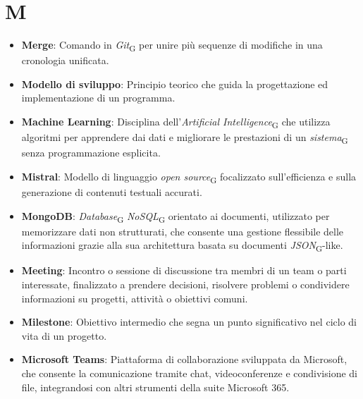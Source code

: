 \section{M}
\begin{itemize}
    \item \textbf{Merge}: Comando in \textit{Git}\textsubscript{G} per unire più sequenze di modifiche in una cronologia unificata.
    \item \textbf{Modello di sviluppo}: Principio teorico che guida la progettazione ed implementazione di un programma.
    \item \textbf{Machine Learning}: Disciplina dell'\textit{Artificial Intelligence}\textsubscript{G} che utilizza algoritmi per apprendere dai dati e migliorare le prestazioni di un \textit{sistema}\textsubscript{G} senza programmazione esplicita.
    \item \textbf{Mistral}: Modello di linguaggio \textit{open source}\textsubscript{G} focalizzato sull'efficienza e sulla generazione di contenuti testuali accurati.
    \item \textbf{MongoDB}: \textit{Database}\textsubscript{G} \textit{NoSQL}\textsubscript{G} orientato ai documenti, utilizzato per memorizzare dati non strutturati, che consente una gestione flessibile delle informazioni grazie alla sua architettura basata su documenti \textit{JSON}\textsubscript{G}-like.
    \item \textbf{Meeting}: Incontro o sessione di discussione tra membri di un team o parti interessate, finalizzato a prendere decisioni, risolvere problemi o condividere informazioni su progetti, attività o obiettivi comuni.
    \item \textbf{Milestone}: Obiettivo intermedio che segna un punto significativo nel ciclo di vita di un progetto.
    \item \textbf{Microsoft Teams}: Piattaforma di collaborazione sviluppata da Microsoft, che consente la comunicazione tramite chat, videoconferenze e condivisione di file, integrandosi con altri strumenti della suite Microsoft 365.
\end{itemize}
